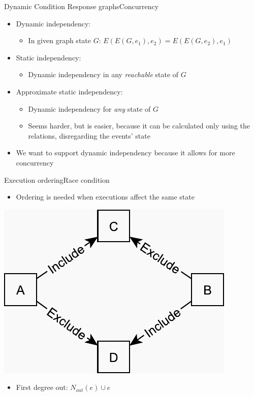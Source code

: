 \documentclass{beamer}
\begin{document}
\begin{frame}{Dynamic Condition Response graphs}{Concurrency}
	\begin{itemize}
		\item Dynamic independency:
		\begin{itemize}
			\item In given graph state $G$: $E(E(G, e_1),e_2)=E(E(G, e_2),e_1)$
		\end{itemize}

		\vfill

		\item Static independency:
		\begin{itemize}
			\item Dynamic independency in any \textit{reachable} state of $G$
		\end{itemize}

		\vfill

		\item Approximate static independency:
		\begin{itemize}
		 	\item Dynamic independency for \textit{any} state of $G$
		 	\item Seems harder, but is easier, because it can be calculated only using the relations, disregarding the events' state
		\end{itemize}

		\vfill

		\item We want to support dynamic independency because it allows for more concurrency
  \end{itemize}
\end{frame}

\begin{frame}{Execution ordering}{Race condition}%
	\begin{itemize}
		\item Ordering is needed when executions affect the same state
	\end{itemize}
	\vspace{\fill}
	\centering
    \includegraphics[scale=0.5]{figures/race-condition.pdf}
    \vspace{\fill}
    \begin{itemize}
    	\item First degree out: $N_{out}(e) \cup e$
    \end{itemize}
\end{frame}
\end{document}
